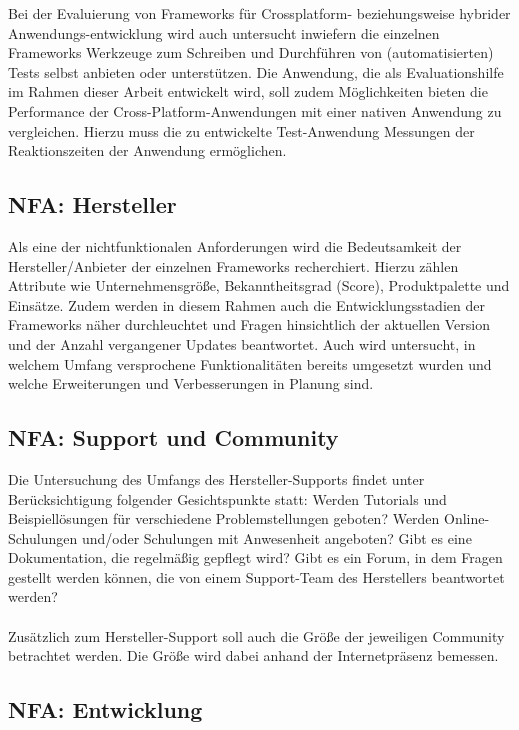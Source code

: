 Bei der Evaluierung von Frameworks für Crossplatform- beziehungsweise hybrider Anwendungs-entwicklung wird auch untersucht inwiefern die einzelnen Frameworks Werkzeuge zum Schreiben und Durchführen von (automatisierten) Tests selbst anbieten oder unterstützen. Die Anwendung, die als Evaluationshilfe im Rahmen dieser Arbeit entwickelt wird, soll zudem Möglichkeiten bieten die Performance der Cross-Platform-Anwendungen mit einer nativen Anwendung zu vergleichen. Hierzu muss die zu entwickelte Test-Anwendung Messungen der Reaktionszeiten der Anwendung ermöglichen. 

\subsection*{NFA: Hersteller}

Als eine der nichtfunktionalen Anforderungen wird die Bedeutsamkeit der Hersteller/Anbieter der einzelnen Frameworks recherchiert. Hierzu zählen Attribute wie Unternehmensgröße, Bekanntheitsgrad (Score), Produktpalette und Einsätze. Zudem werden in diesem Rahmen auch die Entwicklungsstadien der Frameworks näher durchleuchtet und Fragen hinsichtlich der aktuellen Version und der Anzahl vergangener Updates beantwortet. Auch wird untersucht, in welchem Umfang versprochene Funktionalitäten bereits umgesetzt wurden und welche Erweiterungen und Verbesserungen in Planung sind.  

\subsection*{NFA: Support und Community}

Die Untersuchung des Umfangs des Hersteller-Supports findet unter Berücksichtigung folgender Gesichtspunkte statt: Werden Tutorials und Beispiellösungen für verschiedene Problemstellungen geboten? Werden Online-Schulungen und/oder Schulungen mit Anwesenheit angeboten? Gibt es eine Dokumentation, die regelmäßig gepflegt wird? Gibt es ein Forum, in dem Fragen gestellt werden können, die von einem Support-Team des Herstellers beantwortet werden? 
\\\\
Zusätzlich zum Hersteller-Support soll auch die Größe der jeweiligen Community betrachtet werden. Die Größe wird dabei anhand der Internetpräsenz bemessen. 

\subsection*{NFA: Entwicklung}

